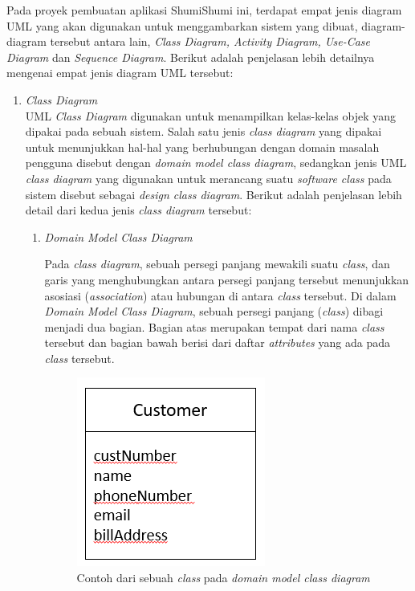 \documentclass[a4paper]{article}
\begin{document}
Pada proyek pembuatan aplikasi ShumiShumi ini, terdapat empat jenis diagram UML yang akan digunakan untuk menggambarkan sistem yang dibuat, diagram-diagram tersebut antara lain, \textit{Class Diagram, Activity Diagram, Use-Case Diagram} dan \textit{Sequence Diagram}. Berikut adalah penjelasan lebih detailnya mengenai empat jenis diagram UML tersebut:
\begin{enumerate}
    \item \textit{Class Diagram}\\
    UML \textit{Class Diagram} digunakan untuk menampilkan kelas-kelas objek yang dipakai pada sebuah sistem. Salah satu jenis \textit{class diagram} yang dipakai untuk menunjukkan hal-hal yang berhubungan dengan domain masalah pengguna disebut dengan \textit{domain model class diagram}, sedangkan jenis UML \textit{class diagram} yang digunakan untuk merancang suatu \textit{software class} pada sistem disebut sebagai \textit{design class diagram}\autocite[103-114]{uml-satzinger}. Berikut adalah penjelasan lebih detail dari kedua jenis \textit{class diagram} tersebut:

    \begin{enumerate}
        \item \textit{Domain Model Class Diagram}
        
        Pada \textit{class diagram}, sebuah persegi panjang mewakili suatu \textit{class}, dan garis yang menghubungkan antara persegi panjang tersebut menunjukkan asosiasi (\textit{association}) atau hubungan di antara \textit{class} tersebut. Di dalam \textit{Domain Model Class Diagram}, sebuah persegi panjang (\textit{class}) dibagi menjadi dua bagian. Bagian atas merupakan tempat dari nama \textit{class} tersebut dan bagian bawah berisi dari daftar \textit{attributes} yang ada pada \textit{class} tersebut\autocite[103-114]{uml-satzinger}. 

        \begin{figure}[h]
            \centering
            \includegraphics[scale=0.5]{images/uml satzinger/domain class diagram/class - domain class diagram.png}
            \caption{Contoh dari sebuah \textit{class} pada \textit{domain model class diagram}}
            \label{fig:domainclass}
        \end{figure}


\end{enumerate}
\end{enumerate}
\end{document}
